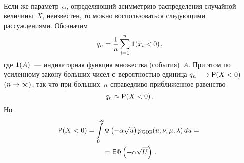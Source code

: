 \begin{multicols}{2}
\begin{figure*}[b] %
\vspace*{1pt}
 \begin{center}
 \mbox{%
 \epsfxsize=161.718mm
 }
 \end{center}
 \vspace*{-9pt}
\end{figure*}


Если же параметр~$\alpha$, определяющий асим\-мет\-рию распределения
случайной величины~$X$, неизвестен, то можно воспользоваться
следующими рассуждениями. Обозначим
$$
q_n=\displaystyle\frac{\displaystyle 1\mathstrut}{\displaystyle n\mathstrut}\sum\limits_{i=1}^n{\bf 1}(x_i<0)\,,
$$
где ${\bf 1}(A)$~--- индикаторная функция множества (события)~$A$.
При этом по усиленному закону больших чисел с~вероятностью единица
$q_n\hm\longrightarrow {\sf P}(X\hm<0)$ $(n\hm\to\infty)$, так что при
больших~$n$ справедливо приближенное равенство
\begin{equation}
q_n\approx{\sf P}(X<0)\,.\label{e11-kor}
\end{equation}
Но
\begin{multline}
{\sf P}(X<0)=\int\limits_{0}^{\infty}\Phi
\left(-\alpha\sqrt{u}\right) p_{\mathrm{GIG}}(u;\nu,\mu,\lambda)\,du={}\\
{}=
{\sf E}\Phi\left(-\alpha\sqrt{U}\right)\,.\label{e12-kor}
\end{multline}

\pagebreak


\end{multicols}
